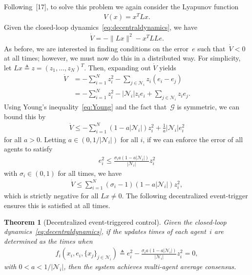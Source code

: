 \documentclass[]{book}
\newtheorem{theorem}{Theorem}[section]
\newcommand{\GG}{{\mathcal{G}}}
\newcommand{\NN}{{\mathcal{N}}}
\newcommand{\TwoNorm}[1]{\|#1\|_2}
\renewcommand{\TwoNorm}[1]{\|#1\|}
\newcommand{\commgraph}{\GG_\text{comm}}
\renewcommand{\commgraph}{\GG}
\begin{document}
Following~[17], to solve this problem we again
consider the Lyapunov function
\begin{align*}
  V(x) = x^T L x.
\end{align*}
Given the closed-loop dynamics~\eqref{eq:decentraldynamics}, we have
\begin{align*}
  \dot{V} = -\TwoNorm{Lx}^2 - x^T L L e .
\end{align*}
As before, we are interested in finding conditions on the error~$e$ such
that~$\dot{V} < 0$ at all times; however, we must now do this in a
distributed way. For simplicity, let $Lx \triangleq z = (z_1, \dots,
z_N)^T$. Then, expanding out $\dot{V}$ yields
\begin{align*}
  \dot{V} &= - \sum_{i=1}^N z_i^2 - \sum_{j \in \NN_i} z_i (e_i - e_j) \\
  &= -\sum_{i=1}^N z_i^2 - | \NN_i | z_i e_i + \sum_{j \in \NN_i} z_i
  e_j .
\end{align*}
Using Young's inequality~\eqref{eq:Young} and the fact
that~$\commgraph$ is symmetric, we can bound this by
\begin{align*}
  \dot{V} \leq - \sum_{i=1}^N (1 - a|\NN_i|)z_i^2 + \frac{1}{a}
  |\NN_i| e_i^2
\end{align*}
for all $a > 0$. Letting $a \in (0, 1/|\NN_i|)$ for all $i$, if we can
enforce the error of all agents to satisfy
\begin{align*}
  e_i^2 \leq \frac{ \sigma_i a (1 - a|\NN_i|)}{|\NN_i|} z_i^2
\end{align*}
with $\sigma_i \in (0,1)$ for all times, we have
\begin{align*}
  \dot{V} \leq \sum_{i=1}^N (\sigma_i - 1)(1-a|\NN_i|)z_i^2,
\end{align*}
which is strictly negative for all $Lx \neq 0$. The following
decentralized event-trigger ensures this is satisfied at all times.

\begin{theorem}[Decentralized event-triggered
  control]\label{th:event-control}
  Given the closed-loop dynamics~\eqref{eq:decentraldynamics}, if the
  updates times of each agent~$i$ are determined as the times when
  \begin{align}\label{eq:decentraltrigger}
    f_i(x_i, e_i, \{ x_j \}_{j \in \NN_i} ) \triangleq e_i^2 - \frac{
      \sigma_i a (1 - a|\NN_i|)}{|\NN_i|} z_i^2 = 0,
  \end{align}
  with $0 < a < 1/|\NN_i|$, then the system achieves multi-agent
  average consensus.
\end{theorem}
\end{document}
